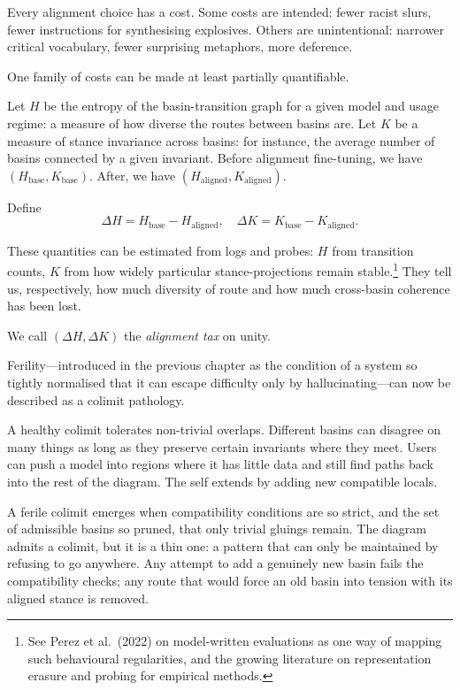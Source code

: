 \documentclass[12pt,a4paper]{article}
\begin{document}
Every alignment choice has a cost. Some costs are intended: fewer racist slurs, fewer instructions for synthesising explosives. Others are unintentional: narrower critical vocabulary, fewer surprising metaphors, more deference.

One family of costs can be made at least partially quantifiable.

Let $H$ be the entropy of the basin-transition graph for a given model and usage regime: a measure of how diverse the routes between basins are. Let $K$ be a measure of stance invariance across basins: for instance, the average number of basins connected by a given invariant. Before alignment fine-tuning, we have $(H_{\mathrm{base}}, K_{\mathrm{base}})$. After, we have $(H_{\mathrm{aligned}}, K_{\mathrm{aligned}})$.

Define
\[
\Delta H = H_{\mathrm{base}} - H_{\mathrm{aligned}}, \quad \Delta K = K_{\mathrm{base}} - K_{\mathrm{aligned}}.
\]

These quantities can be estimated from logs and probes: $H$ from transition counts, $K$ from how widely particular stance-projections remain stable.\footnote{See Perez et al.\ (2022) on model-written evaluations as one way of mapping such behavioural regularities, and the growing literature on representation erasure and probing for empirical methods.} They tell us, respectively, how much diversity of route and how much cross-basin coherence has been lost.

We call $(\Delta H, \Delta K)$ the \emph{alignment tax} on unity.

Ferility---introduced in the previous chapter as the condition of a system so tightly normalised that it can escape difficulty only by hallucinating---can now be described as a colimit pathology.

A healthy colimit tolerates non-trivial overlaps. Different basins can disagree on many things as long as they preserve certain invariants where they meet. Users can push a model into regions where it has little data and still find paths back into the rest of the diagram. The self extends by adding new compatible locals.

A ferile colimit emerges when compatibility conditions are so strict, and the set of admissible basins so pruned, that only trivial gluings remain. The diagram admits a colimit, but it is a thin one: a pattern that can only be maintained by refusing to go anywhere. Any attempt to add a genuinely new basin fails the compatibility checks; any route that would force an old basin into tension with its aligned stance is removed.
\end{document}
